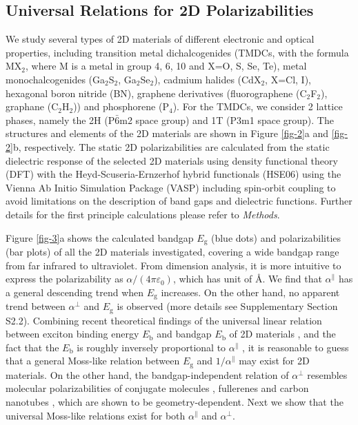 \documentclass[journal=ancac3,manuscript=article,email=true,hyperref=true,keywords=false]{achemso}
\begin{document}
\subsection{Universal Relations for 2D Polarizabilities}
\label{sec:first-principles}

We study several types of 2D materials of different electronic and
optical properties, including transition metal dichalcogenides (TMDCs,
with the formula MX\(_{\text{2}}\), where M is a metal in group 4, 6,
10 and X=O, S, Se, Te), metal monochalcogenides (Ga$_{2}$S$_{2}$,
Ga$_{2}$Se$_{2}$), cadmium halides (CdX$_2$, X=Cl, I), hexagonal boron
nitride (BN), graphene derivatives (fluorographene (C$_{2}$F$_{2}$),
graphane (C$_{2}$H$_{2}$)) and phosphorene (P$_{4}$).  For the TMDCs,
we consider 2 lattice phases, namely the 2H (P\(\bar{6}\)m2 space
group) and 1T (P3m1 space group).  The structures and elements of the
2D materials are shown in Figure \ref{fig-2}a and \ref{fig-2}b,
respectively. The static 2D polarizabilities are calculated from the
static dielectric response of the selected 2D materials using density
functional theory (DFT) with the Heyd-Scuseria-Ernzerhof hybrid
functionals (HSE06) using the Vienna Ab Initio Simulation Package (VASP)
including spin-orbit coupling to avoid limitations on the description
of band gaps and dielectric functions. Further details for the first
principle calculations please refer to \textit{Methods}.

Figure \ref{fig-3}a shows the calculated bandgap $E_{\mathrm{g}}$
(blue dots) and polarizabilities (bar plots) of all the 2D materials
investigated, covering a wide bandgap range from far infrared to
ultraviolet. From dimension analysis, it is more intuitive to express
the polarizability as $\alpha/(4 \pi \varepsilon_{0})$, which has unit
of \AA. We find that $\alpha^{\parallel}$ has a general descending
trend when $E_{\mathrm{g}}$ increases. On the other hand, no apparent
trend between $\alpha^{\perp}$ and $E_{\mathrm{g}}$ is observed (more
details see Supplementary Section S2.2).  Combining recent theoretical
findings of the universal linear relation between exciton binding
energy $E_{\mathrm{b}}$ and bandgap $E_{\mathrm{b}}$ of 2D materials
\cite{Choi_linear_2015,Olsen_2016_hydrogen,Jiang_2017_Eg_Eb}, and the
fact that the $E_{\mathrm{b}}$ is roughly inversely proportional to
$\alpha^{\parallel}$ \cite{Pulci_2014}, it is reasonable to guess that
a general Moss-like relation between $E_{\mathrm{g}}$ and
$1/\alpha^{\parallel}$ may exist for 2D materials. On the other hand,
the bandgap-independent relation of $\alpha^{\perp}$ resembles
molecular polarizabilities of conjugate molecules \cite{Davies_1952},
fullerenes \cite{Sabirov_2014} and carbon nanotubes
\cite{Benedict_1995}, which are shown to be geometry-dependent. Next
we show that the universal Moss-like relations exist for both
$\alpha^{\parallel}$ and $\alpha^{\perp}$.
\end{document}
